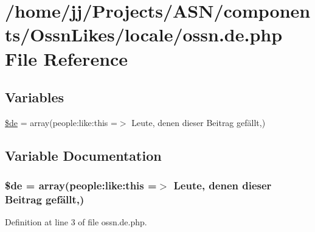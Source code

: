 \hypertarget{components_2_ossn_likes_2locale_2ossn_8de_8php}{}\section{/home/jj/\+Projects/\+A\+S\+N/components/\+Ossn\+Likes/locale/ossn.de.\+php File Reference}
\label{components_2_ossn_likes_2locale_2ossn_8de_8php}
\subsection*{Variables}
\begin{DoxyCompactItemize}
\item 
\hyperlink{components_2_ossn_likes_2locale_2ossn_8de_8php_aab7de7e51b4580005f63dd4cf5e17311}{\$de} = array(\textquotesingle{}people\+:like\+:this\textquotesingle{} =$>$ \textquotesingle{}Leute, denen dieser Beitrag gefällt\textquotesingle{},)
\end{DoxyCompactItemize}


\subsection{Variable Documentation}
\subsubsection[{\texorpdfstring{\$de}{$de}}]{\setlength{\rightskip}{0pt plus 5cm}\$de = array(\textquotesingle{}people\+:like\+:this\textquotesingle{} =$>$ \textquotesingle{}Leute, denen dieser Beitrag gefällt\textquotesingle{},)}\hypertarget{components_2_ossn_likes_2locale_2ossn_8de_8php_aab7de7e51b4580005f63dd4cf5e17311}{}\label{components_2_ossn_likes_2locale_2ossn_8de_8php_aab7de7e51b4580005f63dd4cf5e17311}


Definition at line 3 of file ossn.\+de.\+php.

